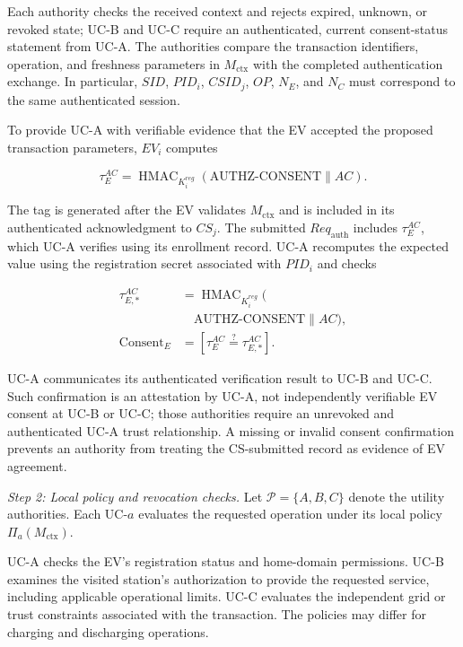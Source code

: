 \documentclass[twocolumn,10pt,journal]{IEEEtran}
\begin{document}
Each authority checks the received context and rejects expired,
unknown, or revoked state; UC-B and UC-C require an authenticated,
current consent-status statement from UC-A. The authorities compare
the transaction identifiers, operation, and freshness parameters in
$M_{\mathrm{ctx}}$ with the completed authentication
exchange. In particular, $SID$, $PID_i$, $CSID_j$,
$OP$, $N_E$, and $N_C$ must correspond to the
same authenticated session.

To provide UC-A with verifiable evidence that the EV
accepted the proposed transaction parameters,
$EV_i$ computes

\begin{equation}
\tau_E^{AC} =
\operatorname{HMAC}_{K_i^{reg}}
\left(
\mathrm{AUTHZ\mbox{-}CONSENT}
\parallel AC
\right).
\label{eq:qsv2g_ev_authz_consent}
\end{equation}

The tag is generated after the EV validates
$M_{\mathrm{ctx}}$ and is included in its
authenticated acknowledgment to $CS_j$.
The submitted $Req_{\mathrm{auth}}$ includes
$\tau_E^{AC}$, which UC-A verifies using its enrollment record. UC-A recomputes the expected
value using the registration secret associated with
$PID_i$ and checks

\begin{equation}
\begin{aligned}
\tau_{E,*}^{AC} &=\operatorname{HMAC}_{K_i^{reg}}\big(\\
&\quad \mathrm{AUTHZ\mbox{-}CONSENT}\parallel AC\big),\\
\operatorname{Consent}_{E}&=
[\tau_E^{AC}\stackrel{?}{=}\tau_{E,*}^{AC}].
\end{aligned}
\label{eq:qsv2g_ev_consent_verify}
\end{equation}

UC-A communicates its authenticated verification
result to UC-B and UC-C. Such confirmation is an attestation by
UC-A, not independently verifiable EV consent at UC-B or UC-C;
those authorities require an unrevoked and authenticated UC-A
trust relationship. A missing or invalid
consent confirmation prevents an authority from
treating the CS-submitted record as evidence of
EV agreement.

\textit{Step 2: Local policy and revocation checks.}
Let $\mathcal{P}=\{A,B,C\}$ denote the utility
authorities. Each UC-$a$ evaluates the requested
operation under its local policy
$\Pi_a(M_{\mathrm{ctx}})$.

UC-A checks the EV's registration status and
home-domain permissions. UC-B examines the
visited station's authorization to provide the
requested service, including applicable
operational limits. UC-C evaluates the
independent grid or trust constraints associated
with the transaction. The policies may differ
for charging and discharging operations.
\end{document}
